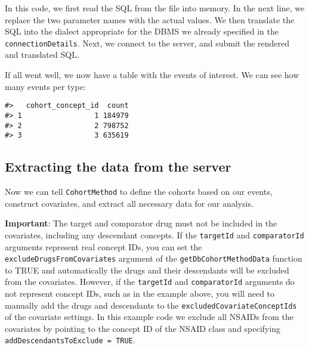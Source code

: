 \documentclass[]{article}
\newenvironment{Shaded}{\begin{snugshade}}{\end{snugshade}}
\newcommand{\DataTypeTok}[1]{\textcolor[rgb]{0.13,0.29,0.53}{#1}}
\newcommand{\KeywordTok}[1]{\textcolor[rgb]{0.13,0.29,0.53}{\textbf{#1}}}
\newcommand{\NormalTok}[1]{#1}
\newcommand{\OperatorTok}[1]{\textcolor[rgb]{0.81,0.36,0.00}{\textbf{#1}}}
\newcommand{\StringTok}[1]{\textcolor[rgb]{0.31,0.60,0.02}{#1}}
\begin{document}
In this code, we first read the SQL from the file into memory. In the
next line, we replace the two parameter names with the actual values. We
then translate the SQL into the dialect appropriate for the DBMS we
already specified in the \texttt{connectionDetails}. Next, we connect to
the server, and submit the rendered and translated SQL.

If all went well, we now have a table with the events of interest. We
can see how many events per type:

\begin{Shaded}
\end{Shaded}

\begin{verbatim}
#>   cohort_concept_id  count
#> 1                 1 184979
#> 2                 2 798752
#> 3                 3 635619
\end{verbatim}

\hypertarget{extracting-the-data-from-the-server}{%
\subsection{Extracting the data from the
server}\label{extracting-the-data-from-the-server}}

Now we can tell \texttt{CohortMethod} to define the cohorts based on our
events, construct covariates, and extract all necessary data for our
analysis.

\textbf{Important}: The target and comparator drug must not be included
in the covariates, including any descendant concepts. If the
\texttt{targetId} and \texttt{comparatorId} arguments represent real
concept IDs, you can set the \texttt{excludeDrugsFromCovariates}
argument of the \texttt{getDbCohortMethodData} function to TRUE and
automatically the drugs and their descendants will be excluded from the
covariates. However, if the \texttt{targetId} and \texttt{comparatorId}
arguments do not represent concept IDs, such as in the example above,
you will need to manually add the drugs and descendants to the
\texttt{excludedCovariateConceptIds} of the covariate settings. In this
example code we exclude all NSAIDs from the covariates by pointing to
the concept ID of the NSAID class and specifying
\texttt{addDescendantsToExclude\ =\ TRUE}.
\end{document}
